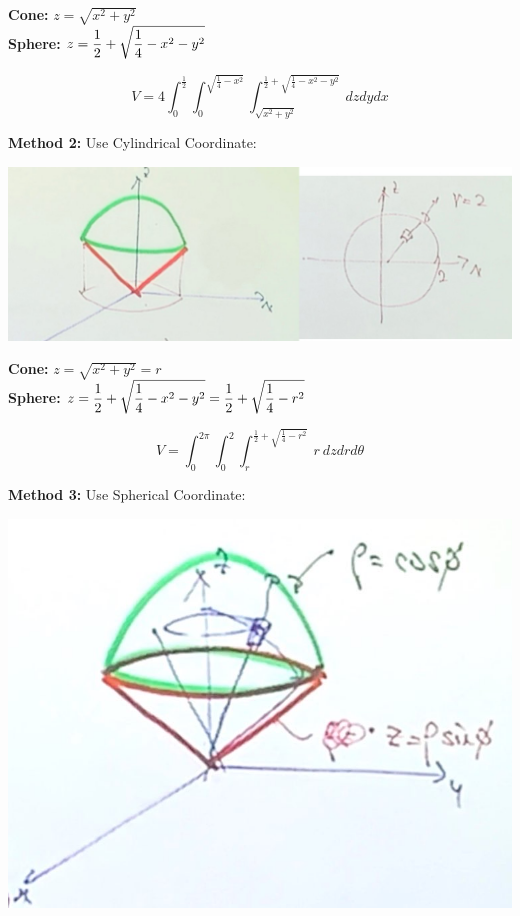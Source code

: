 \documentclass[11pt, a4paper]{MATH2023}
\begin{document}
\begin{spacing}{1.3}
    {\bf Cone:} $z=\sqrt{x^2+y^2}$\\
    {\bf Sphere:} $\displaystyle z=\frac{1}{2}+\sqrt{\frac{1}{4}-x^2-y^2}$

    $$V=4\int_0^{\frac{1}{2}}\int_0^{\sqrt{\frac{1}{4}-x^2}} \int_{\sqrt{x^2+y^2}}^{\frac{1}{2}+\sqrt{\frac{1}{4}-x^2-y^2}}
    \ dzdydx$$

    {\bf Method 2:} Use Cylindrical Coordinate: 
    \begin{center}
        \includegraphics[scale=0.3]{images/Ch14-ex6.10-cylind.jpg}
    \end{center}
    
    {\bf Cone:} $z=\sqrt{x^2+y^2}=r$\\
    {\bf Sphere:} $\displaystyle z=\frac{1}{2}+\sqrt{\frac{1}{4}-x^2-y^2}=\frac{1}{2}+\sqrt{\frac{1}{4}-r^2}$

    $$V=\int_0^{2\pi} \int_0^2 \int_r^{\frac{1}{2}+\sqrt{\frac{1}{4}-r^2}}\ r\ dzdrd\theta$$

    {\bf Method 3:} Use Spherical Coordinate: 
    \begin{center}
        \includegraphics[scale=0.28]{images/Ch14-ex6.10-sphere.JPG}
    \end{center}
    

\end{spacing}
\end{document}

